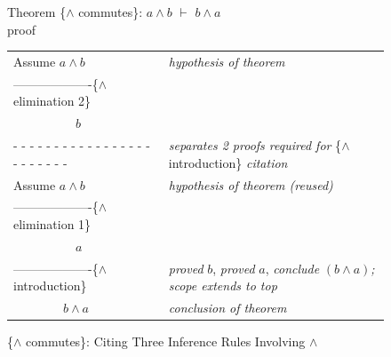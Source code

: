 \begin{figure}
Theorem \{$\wedge$ commutes\}: $a \wedge b$ $\vdash$ $b \wedge a$ \\
proof
\begin{center}
\begin{tabular}{ll}
Assume $a \wedge b$                             &\emph{hypothesis of theorem}\\
-------------------\{$\wedge$ elimination 2\}   &\\
~~~~~~~~~~$b$                                   &\\
 - - - - - - - - - - - - - - - - - - - - - - - -&\emph{separates 2 proofs required for }\{$\wedge$ introduction\} \emph{citation}\\
Assume $a \wedge b$                             &\emph{hypothesis of theorem (reused)}\\
-------------------\{$\wedge$ elimination 1\}   &\\
~~~~~~~~~~$a$                                   &\\
-------------------\{$\wedge$ introduction\}    &\emph{proved} $b$, \emph{proved} $a$, \emph{conclude} $(b \wedge a)$\emph{; scope extends to top}\\
~~~~~~~~$b \wedge a$                            &\emph{conclusion of theorem}\\
\end{tabular}
\end{center}
\caption{\{$\wedge$ commutes\}: Citing Three Inference Rules Involving $\wedge$}
\label{fig:and-commutes-proof}
\end{figure}


